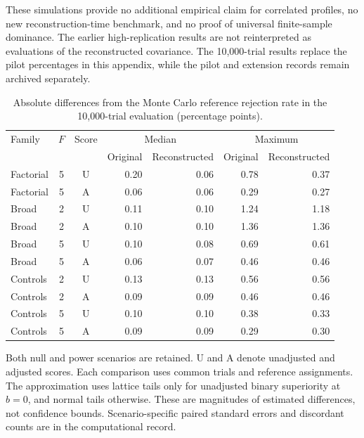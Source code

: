 \documentclass[12pt,a4paper]{article}
\theoremstyle{definition}
\theoremstyle{remark}\newtheorem{remark}{Remark}
\numberwithin{equation}{section}
\begin{document}
These simulations provide no additional empirical claim for correlated profiles, no new reconstruction-time benchmark, and no proof of universal finite-sample dominance. The earlier high-replication results are not reinterpreted as evaluations of the reconstructed covariance. The 10,000-trial results replace the pilot percentages in this appendix, while the pilot and extension records remain archived separately.

\clearpage
\begin{table}[!htbp]\centering
\caption{Absolute differences from the Monte Carlo reference rejection rate in the 10,000-trial evaluation (percentage points).}
\label{tab:supp-pilot-paired}
\begin{threeparttable}\small
\begin{tabular}{@{}lccrrrr@{}}
\toprule
Family & $F$ & Score & \multicolumn{2}{c}{Median} & \multicolumn{2}{c}{Maximum}\\
 & & & Original & Reconstructed & Original & Reconstructed\\
\midrule
Factorial & 5 & U & 0.20 & 0.06 & 0.78 & 0.37\\
Factorial & 5 & A & 0.06 & 0.06 & 0.29 & 0.27\\
Broad & 2 & U & 0.11 & 0.10 & 1.24 & 1.18\\
Broad & 2 & A & 0.10 & 0.10 & 1.36 & 1.36\\
Broad & 5 & U & 0.10 & 0.08 & 0.69 & 0.61\\
Broad & 5 & A & 0.06 & 0.07 & 0.46 & 0.46\\
Controls & 2 & U & 0.13 & 0.13 & 0.56 & 0.56\\
Controls & 2 & A & 0.09 & 0.09 & 0.46 & 0.46\\
Controls & 5 & U & 0.10 & 0.10 & 0.38 & 0.33\\
Controls & 5 & A & 0.09 & 0.09 & 0.29 & 0.30\\
\bottomrule\end{tabular}
\begin{tablenotes}[flushleft]\small
\item[] Both null and power scenarios are retained. U and A denote unadjusted and adjusted scores. Each comparison uses common trials and reference assignments. The approximation uses lattice tails only for unadjusted binary superiority at $b=0$, and normal tails otherwise. These are magnitudes of estimated differences, not confidence bounds. Scenario-specific paired standard errors and discordant counts are in the computational record.
\end{tablenotes}\end{threeparttable}\end{table}
\end{document}
